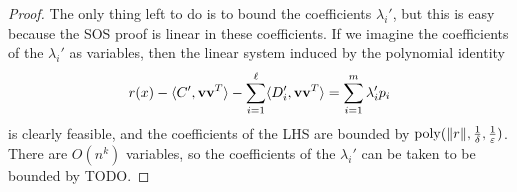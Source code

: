 \begin{proof}
The only thing left to do is to bound the coefficients $\lambda_i'$, but this is easy because the SOS proof is linear in these coefficients. If we imagine the coefficients of the $\lambda_i'$ as variables, then the linear system induced by the polynomial identity
\[r(x) - \langle C', {\bf v}{\bf v}^T\rangle - \sum_{i=1}^\ell \langle D_i', {\bf v}{\bf v}^T\rangle = \sum_{i=1}^m \lambda_i' p_i\]
is clearly feasible, and the coefficients of the LHS are bounded by $\operatorname{poly}(\|r\|, \frac{1}{\delta}, \frac{1}{\varepsilon})$. There are $O(n^k)$ variables, so the coefficients of the $\lambda_i'$ can be taken to be bounded by TODO.




\end{proof}
